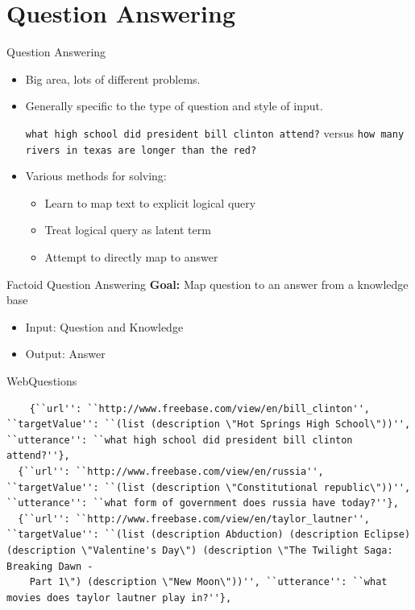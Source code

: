 \documentclass{beamer}
\begin{document}
\section{Question Answering}

\begin{frame}{Question Answering}
  \begin{itemize}
  \item Big area, lots of different problems.
    \air 
  \item Generally specific to the type of question and style of input. 
    \air 

    \texttt{what high school did president bill clinton attend?}
    versus 
    \texttt{how many rivers in texas are longer than the red?}

  \item Various methods for solving:
    \begin{itemize}
    \item Learn to map text to explicit logical query
    \item Treat logical query as latent term 
    \item Attempt to directly map to answer  
    \end{itemize}
  \end{itemize}
\end{frame}

\begin{frame}{Factoid Question Answering}
  \textbf{Goal:} Map question to an answer from a  knowledge base

  \begin{itemize}
  \item Input: Question and Knowledge 
  \item Output: Answer
  \end{itemize}
\end{frame}

\begin{frame}[fragile]{WebQuestions}
\begin{verbatim}
    {``url'': ``http://www.freebase.com/view/en/bill_clinton'', ``targetValue'': ``(list (description \"Hot Springs High School\"))'', ``utterance'': ``what high school did president bill clinton attend?''},                    
  {``url'': ``http://www.freebase.com/view/en/russia'', ``targetValue'': ``(list (description \"Constitutional republic\"))'', ``utterance'': ``what form of government does russia have today?''},                              
  {``url'': ``http://www.freebase.com/view/en/taylor_lautner'', ``targetValue'': ``(list (description Abduction) (description Eclipse) (description \"Valentine's Day\") (description \"The Twilight Saga: Breaking Dawn -  
    Part 1\") (description \"New Moon\"))'', ``utterance'': ``what movies does taylor lautner play in?''},
\end{verbatim}
\end{frame}
\end{document}
